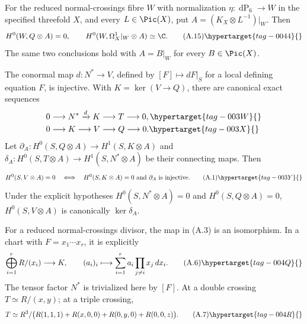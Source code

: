 
\begin{proposition}\hypertarget{tag-01AQ}{}\label{cdp:st:A.4.1}


For the reduced normal-crossings fibre $W$ with normalization $\eta:\operatorname{dP}_6\to W$ in the specified threefold $X$, and every $L\in\Pic(X)$, put $A=(K_X\otimes L^{-1})|_W$. Then
\[
H^0(W,Q\otimes A)=0,
\qquad H^0(W,\Omega_X^1|_W\otimes A)\simeq\C.
\tag{A.15}\hypertarget{tag-0044}{}\label{cdp:eq:A.15}
\]
The same two conclusions hold with $A=B|_W$ for every $B\in\Pic(X)$.
\end{proposition}

\begin{proposition}\hypertarget{tag-01AD}{}\label{cdp:st:A.1.1}

\label{wbII:prop:criterion}\label{wbII:prop:filtration}\label{wbII:lem:conormal}\label{wbII:lem:conormal-injective}\label{wbII:prop:missing-global-section-criterion}\label{wbII:prop:missing-cotangent-filtration}
The conormal map $d:N^*\to V$, defined by $[F]\mapsto dF|_S$ for a local defining equation $F$, is injective. With $K=\ker(V\to Q)$, there are canonical exact sequences
\begin{align}
0&\longrightarrow N^*\xrightarrow{d}K\longrightarrow T\longrightarrow0,
\hypertarget{tag-003W}{}\label{cdp:A:filtration1}\\
0&\longrightarrow K\longrightarrow V\longrightarrow Q\longrightarrow0.
\hypertarget{tag-003X}{}\label{cdp:A:filtration2}
\end{align}
Let $\partial_A:H^0(S,Q\otimes A)\to H^1(S,K\otimes A)$ and $\delta_A:H^0(S,T\otimes A)\to H^1(S,N^*\otimes A)$ be their connecting maps. Then
\[
 H^0(S,V\otimes A)=0
 \quad\Longleftrightarrow\quad
 H^0(S,K\otimes A)=0\ \hbox{and}\ \partial_A\hbox{ is injective}.
\tag{A.1}\hypertarget{tag-003Y}{}\label{cdp:eq:A.1}
\]
Under the explicit hypotheses $H^0(S,N^*\otimes A)=0$ and $H^0(S,Q\otimes A)=0$, $H^0(S,V\otimes A)$ is canonically $\ker\delta_A$.
\end{proposition}

\begin{proposition}\hypertarget{tag-01AE}{}\label{cdp:st:A.1.2}


For a reduced normal-crossings divisor, the map in (A.3) is an isomorphism. In a chart with $F=x_1\cdots x_r$, it is explicitly
\[
 \bigoplus_{i=1}^r R/(x_i)\longrightarrow K,
 \qquad (a_i)_i\longmapsto
 \sum_{i=1}^r a_i\prod_{j\ne i}x_j\,dx_i.
\tag{A.6}\hypertarget{tag-004Q}{}\label{cdp:eq:A.6}
\]
The tensor factor $N^*$ is trivialized here by $[F]$. At a double crossing $T\simeq R/(x,y)$; at a triple crossing,
\[
 T\simeq R^3/\bigl(R(1,1,1)+R(x,0,0)+R(0,y,0)+R(0,0,z)\bigr).
\tag{A.7}\hypertarget{tag-004R}{}\label{cdp:eq:A.7}
\]
\end{proposition}


